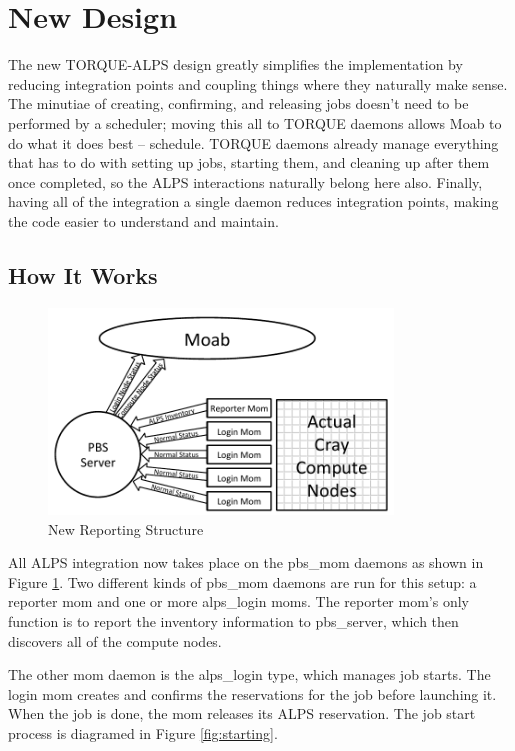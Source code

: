 \section{New Design}

The new TORQUE-ALPS design greatly simplifies the implementation by reducing
integration points and coupling things where they naturally make sense. The
minutiae of creating, confirming, and releasing jobs doesn't need to be
performed by a scheduler; moving this all to TORQUE daemons allows Moab to do
what it does best – schedule. TORQUE daemons already manage everything that has
to do with setting up jobs, starting them, and cleaning up after them once
completed, so the ALPS interactions naturally belong here also. Finally, having
all of the integration a single daemon reduces integration points, making the
code easier to understand and maintain.

\subsection{How It Works}
\begin{figure}
  \centering
  \includegraphics[width=3.6in]{figures/new-diagram.pdf}
  \caption{New Reporting Structure}\label{fig:reporting}
\end{figure}

All ALPS integration now takes place on the pbs_mom daemons as shown in Figure
\ref{fig:reporting}. Two different kinds of pbs_mom daemons are run for this
setup: a reporter mom and one or more alps_login moms. The reporter mom's only
function is to report the inventory information to pbs_server, which then
discovers all of the compute nodes.

The other mom daemon is the alps_login type, which manages job starts. The
login mom creates and confirms the reservations for the job before launching
it. When the job is done, the mom releases its ALPS reservation. The job start
process is diagramed in Figure \ref{fig:starting}.

